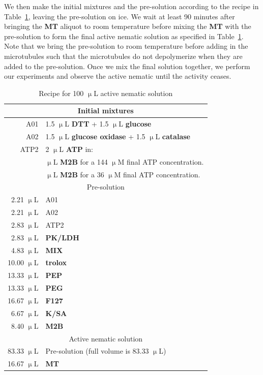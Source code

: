 We then make the initial mixtures and the pre-solution according to the recipe in Table~\ref{t:3-recipe}, leaving the pre-solution on ice.
We wait at least 90 minutes after bringing the {\bf MT} aliquot to room temperature before mixing the {\bf MT} with the pre-solution to form the final active nematic solution as specified in Table~\ref{t:3-recipe}.
Note that we bring the pre-solution to room temperature before adding in the microtubules such that the microtubules do not depolymerize when they are added to the pre-solution.
Once we mix the final solution together, we perform our experiments and observe the active nematic until the activity ceases.
\begin{table}[ht]
  \centering
  \caption{Recipe for 100 $\upmu$L active nematic solution}
  \begin{tabular}{|r l|}
    \hline
    \multicolumn{2}{|c|}{Initial mixtures}\\
    \hline
    A01 & 1.5 $\upmu$L {\bf DTT} + 1.5 $\upmu$L {\bf glucose} \\
    A02 & 1.5 $\upmu$L {\bf glucose oxidase} + 1.5 $\upmu$L {\bf catalase} \\
    ATP2 & 2 $\upmu$L {\bf ATP} in:\\
    & \quad 18 $\upmu$L {\bf M2B} for a 144 $\upmu$M final ATP concentration.\\
    & \quad 38 $\upmu$L {\bf M2B} for a 36 $\upmu$M final ATP concentration.\\
    \hline
    \multicolumn{2}{|c|}{Pre-solution}\\
    \hline
    2.21 $\upmu$L & A01\\
    2.21 $\upmu$L & A02\\
    2.83 $\upmu$L & ATP2\\
    2.83 $\upmu$L & {\bf PK/LDH} \\
    4.83 $\upmu$L & {\bf MIX}\\
    10.00 $\upmu$L & {\bf trolox}\\
    13.33 $\upmu$L & {\bf PEP}\\
    13.33 $\upmu$L & {\bf PEG}\\
    16.67 $\upmu$L & {\bf F127}\\
    6.67 $\upmu$L & {\bf K/SA}\\
    8.40 $\upmu$L & {\bf M2B}\\
    \hline
    \multicolumn{2}{|c|}{Active nematic solution}\\
    \hline
    83.33 $\upmu$L & Pre-solution (full volume is 83.33 $\upmu$L)\\
    16.67 $\upmu$L & {\bf MT}\\
    \hline
  \end{tabular}
  \label{t:3-recipe}
\end{table}


